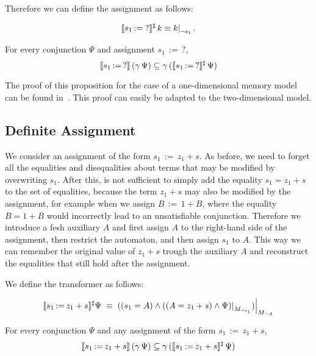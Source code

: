 
Therefore we can define the assignment as follows:

\[
	\sem{s_1\,{:=}\;?}^\sharp\,k \equiv \restr{k}{\neg s_1}.
\]

\begin{proposition}\label{p:ass-unknown}
	For every conjunction $\Psi$ and assignment $s_1\,{:=}\,?$,
	\[
		\llbracket s_1\,{:=}\,?\rrbracket\,(\gamma\,\Psi) \subseteq \gamma\,(\llbracket s_1\,{:=}\,?\rrbracket^\sharp\,\Psi)
	\]
\end{proposition}

The proof of this proposition for the case of a one-dimensional memory model can be found in~\cite{2pointer}.
This proof can easily be adapted to the two-dimensional model.

\subsection{Definite Assignment}

We consider an assignment of the form $s_1\,{:=}\,z_1+s$.
As before, we need to forget all the equalities and disequalities about terms that may be modified by overwriting $s_1$.
After this, is not sufficient to simply add the equality $s_1 = z_1+s$ to the set of equalities, because the term $z_1 + s$ may also be modified by the assignment, for example when we assign $B\,{:=}\,1+B$, where the equality $B = 1 + B$ would incorrectly lead to an unsatisfiable conjunction.
Therefore we introduce a fesh auxiliary $A$ and first assign $A$ to the right-hand side of the assignment, then restrict the automaton, and then assign $s_1$ to $A$.
This way we can remember the original value of $z_1 + s$ trough the auxiliary $A$ and reconstruct the equalities that still hold after the assignment.

We define the transformer as follows:

\[
	\sem{s_1\,{:=}\,z_1+s}^\sharp\Psi\;\equiv\;
	\restr{((s_1=A)\land\restr{((A=z_1+s)\land\Psi)}{M_{\neg s_1}})}{M_{\neg A}}
\]

\begin{proposition}\label{p:ass-definite}
	For every conjunction $\Psi$ and any assignment of the form $s_1\,{:=}\,z_1+s$,
	\[
		\llbracket s_1\,{:=}\,z_1+s\rrbracket\,(\gamma\,\Psi) \subseteq \gamma\,(\llbracket s_1\,{:=}\,z_1+s\rrbracket^\sharp\,\Psi)
	\]
\end{proposition}

